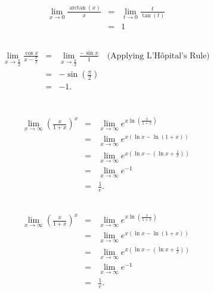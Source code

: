 \documentclass{article}
\begin{document}
						\subsection{}
\[
\begin{array}{rcl}
	\lim_{x \to 0} \frac{\arctan(x)}{x} 
	& = & \lim_{t \to 0} \frac{t}{\tan(t)} \\
	& = & 1
\end{array}
\]
						\subsection{}
\[
\begin{array}{rcl}
	\lim_{x \to \frac{\pi}{2}} \frac{\cos x}{x - \frac{\pi}{2}} 
	& = & \lim_{x \to \frac{\pi}{2}} \frac{-\sin x}{1} \quad \text{(Applying L'Hôpital's Rule)} \\
	& = & -\sin\left(\frac{\pi}{2}\right) \\
	& = & -1.
\end{array}
\]
					\section{}

						\subsection{}

\[
\begin{array}{rcl}
	\lim_{x \to \infty} \left( \frac{x}{1+x} \right)^x 
	& = & \lim_{x \to \infty} e^{x \ln\left( \frac{x}{1+x} \right)} \\
	& = & \lim_{x \to \infty} e^{x \left( \ln x - \ln(1+x) \right)} \\
	& = & \lim_{x \to \infty} e^{x \left( \ln x - \left( \ln x + \frac{1}{x} \right) \right)} \\
	& = & \lim_{x \to \infty} e^{-1} \\
	& = & \frac{1}{e}.
\end{array}
\]


						\subsection{}

\[
\begin{array}{rcl}
	\lim_{x \to \infty} \left( \frac{x}{1+x} \right)^x 
	& = & \lim_{x \to \infty} e^{x \ln\left( \frac{x}{1+x} \right)} \\
	& = & \lim_{x \to \infty} e^{x \left( \ln x - \ln(1+x) \right)} \\
	& = & \lim_{x \to \infty} e^{x \left( \ln x - \left( \ln x + \frac{1}{x} \right) \right)} \\
	& = & \lim_{x \to \infty} e^{-1} \\
	& = & \frac{1}{e}.
\end{array}
\]
\end{document}
